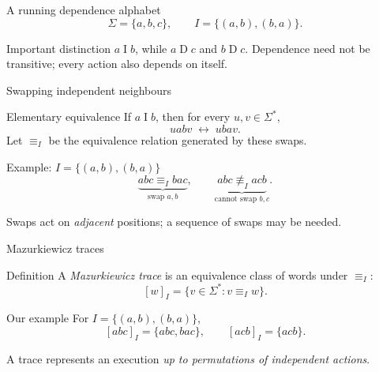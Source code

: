 \documentclass[t,11pt]{beamer}
\newcommand{\ind}{\mathrel{I}}
\newcommand{\dep}{\mathrel{D}}
\begin{document}
\begin{frame}{A running dependence alphabet}
  \[
    \Sigma=\{a,b,c\},\qquad I=\{(a,b),(b,a)\}.
  \]
  \begin{center}
  \end{center}
  \begin{block}{Important distinction}
    $a\ind b$, while $a\dep c$ and $b\dep c$. Dependence need not be transitive; every action also depends on itself.
  \end{block}
\end{frame}

\begin{frame}{Swapping independent neighbours}
  \begin{block}{Elementary equivalence}
    If $a\ind b$, then for every $u,v\in\Sigma^*$,
    \[
      uabv \;\longleftrightarrow\; ubav.
    \]
    Let $\equiv_I$ be the equivalence relation generated by these swaps.
  \end{block}
  \begin{block}{Example: $I=\{(a,b),(b,a)\}$}
    \[
    \underbrace{abc\equiv_I bac}_{\text{swap }a,b},
    \qquad
    \underbrace{abc\not\equiv_I acb}_{\text{cannot swap }b,c}.
    \]
  \end{block}
  Swaps act on \emph{adjacent} positions; a sequence of swaps may be needed.
\end{frame}

\begin{frame}{Mazurkiewicz traces}
  \begin{block}{Definition}
    A \emph{Mazurkiewicz trace} is an equivalence class of words under $\equiv_I$:
    \[
      [w]_I=\{v\in\Sigma^*:v\equiv_I w\}.
    \]
  \end{block}
  \begin{block}{Our example}
    For $I=\{(a,b),(b,a)\}$,
    \[
      [abc]_I=\{abc,bac\},\qquad [acb]_I=\{acb\}.
    \]
  \end{block}
  \vspace{0.25cm}
  A trace represents an execution \emph{up to permutations of independent actions}.
\end{frame}
\end{document}
